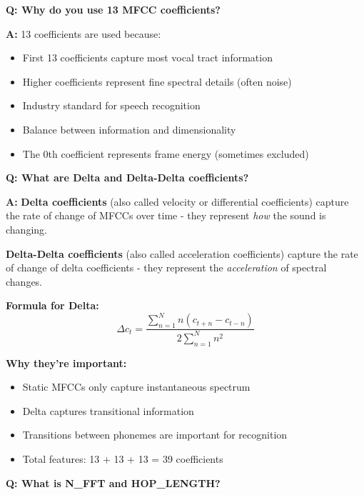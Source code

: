 \documentclass[a4paper,12pt]{article}
\newcommand{\vivaQ}[1]{\textcolor{questioncolor}{\textbf{Q: #1}}}
\newcommand{\vivaA}[1]{\textcolor{answercolor}{\textbf{A:}} #1}
\begin{document}
\vspace{0.5cm}

\vivaQ{Why do you use 13 MFCC coefficients?}

\vivaA{13 coefficients are used because:
\begin{itemize}
    \item First 13 coefficients capture most vocal tract information
    \item Higher coefficients represent fine spectral details (often noise)
    \item Industry standard for speech recognition
    \item Balance between information and dimensionality
    \item The 0th coefficient represents frame energy (sometimes excluded)
\end{itemize}}

\vspace{0.5cm}

\vivaQ{What are Delta and Delta-Delta coefficients?}

\vivaA{\textbf{Delta coefficients} (also called velocity or differential coefficients) capture the rate of change of MFCCs over time - they represent \textit{how} the sound is changing.

\textbf{Delta-Delta coefficients} (also called acceleration coefficients) capture the rate of change of delta coefficients - they represent the \textit{acceleration} of spectral changes.

\textbf{Formula for Delta:}
\[\Delta c_t = \frac{\sum_{n=1}^{N} n(c_{t+n} - c_{t-n})}{2\sum_{n=1}^{N} n^2}\]

\textbf{Why they're important:}
\begin{itemize}
    \item Static MFCCs only capture instantaneous spectrum
    \item Delta captures transitional information
    \item Transitions between phonemes are important for recognition
    \item Total features: 13 + 13 + 13 = 39 coefficients
\end{itemize}}

\vspace{0.5cm}

\vivaQ{What is N\_FFT and HOP\_LENGTH?}
\end{document}
